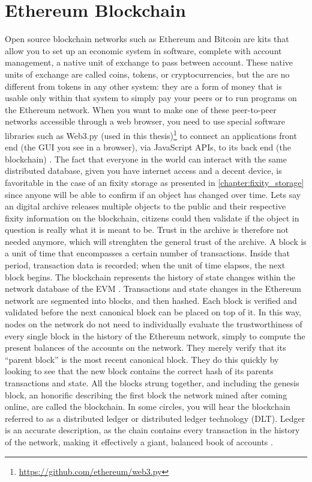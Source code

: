\section{Ethereum Blockchain}
\label{sec:eth-blockchain}
Open source blockchain networks such as Ethereum and Bitcoin are kits that allow you to set up an economic system in software, complete with account management, a native unit of exchange to pass between account. These native units of exchange are called coins, tokens, or cryptocurrencies, but the are no different from tokens in any other system: they are a form of money  that is usable only within that system to simply pay your peers or to run programs on the Ethereum network. When you want to make one of these peer-to-peer networks accessible through a web browser, you need to use special software libraries such as Web3.py (used in this thesis)\footnote{\url{https://github.com/ethereum/web3.py}} to connect an applications front end (the GUI you see in a browser), via JavaScript APIs, to its back end (the blockchain) \cite[2]{dannen2017introducing}.
The fact that everyone in the world can interact with the same distributed database, given you have internet access and a decent device, is favoritable in the case of an fixity storage as presented in \ref{chapter:fixity_storage} since anyone will be able to confirm if an object has changed over time. Lets say an digital archive releases multiple objects to the public and their respective fixity information on the blockchain, citizens could then validate if the object in question is really what it is meant to be. Trust in the archive is therefore not needed anymore, which will strenghten the general trust of the archive.
A block is a unit of time that encompasses a certain number of transactions. Inside that period, transaction data is recorded; when the unit of time elapses, the next block begins. The blockchain represents the history of state changes within the network database of the EVM \cite[43]{dannen2017introducing}.
Transactions and state changes in the Ethereum network are segmented into blocks, and then hashed. Each block is verified and validated before the next canonical block can be placed on top of it. In this way, nodes on the network do not need to individually evaluate the trustworthiness of every single block in the history of the Ethereum network, simply to compute the present balances of the accounts on the network. They merely verify that its “parent block” is the most recent canonical block. They do this quickly by looking to see that the new block contains the correct hash of its parents transactions and state. All the blocks strung together, and including the genesis block, an honorific describing the first block the network mined after coming online, are called the blockchain. In some circles, you will hear the blockchain referred to as a distributed ledger or distributed ledger technology (DLT). Ledger is an accurate description, as the chain contains every transaction in the history of the network, making it effectively a giant, balanced book of accounts \cite[55]{dannen2017introducing}. 
